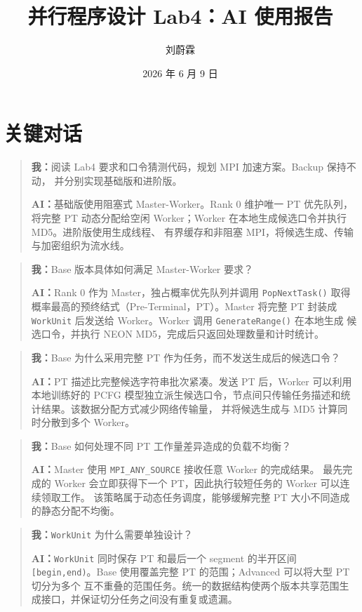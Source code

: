 \documentclass[12pt,a4paper]{ctexart}
\title{并行程序设计 Lab4：AI 使用报告}
\author{刘蔚霖\quad 2412727}
\date{2026 年 6 月 9 日}
\newcommand{\code}[1]{\nolinkurl{#1}}
\newenvironment{dialogue}
  {\begin{quote}\small\setlength{\parskip}{0.45em}}
  {\end{quote}}
\begin{document}
\maketitle

\section{关键对话}

\begin{dialogue}
\textbf{我：}阅读 Lab4 要求和口令猜测代码，规划 MPI 加速方案。Backup 保持不动，
并分别实现基础版和进阶版。

\textbf{AI：}基础版使用阻塞式 Master-Worker。Rank 0 维护唯一 PT 优先队列，将完整 PT
动态分配给空闲 Worker；Worker 在本地生成候选口令并执行 MD5。进阶版使用生成线程、
有界缓存和非阻塞 MPI，将候选生成、传输与加密组织为流水线。

\end{dialogue}

\begin{dialogue}
\textbf{我：}Base 版本具体如何满足 Master-Worker 要求？

\textbf{AI：}Rank 0 作为 Master，独占概率优先队列并调用 \code{PopNextTask()}
取得概率最高的预终结式（Pre-Terminal，PT）。Master 将完整 PT 封装成
\code{WorkUnit} 后发送给 Worker。Worker 调用 \code{GenerateRange()} 在本地生成
候选口令，并执行 NEON MD5，完成后只返回处理数量和计时统计。
\end{dialogue}

\begin{dialogue}
\textbf{我：}Base 为什么采用完整 PT 作为任务，而不发送生成后的候选口令？

\textbf{AI：}PT 描述比完整候选字符串批次紧凑。发送 PT 后，Worker 可以利用本地训练好的
PCFG 模型独立派生候选口令，节点间只传输任务描述和统计结果。该数据分配方式减少网络传输量，
并将候选生成与 MD5 计算同时分散到多个 Worker。
\end{dialogue}

\begin{dialogue}
\textbf{我：}Base 如何处理不同 PT 工作量差异造成的负载不均衡？

\textbf{AI：}Master 使用 \code{MPI\_ANY\_SOURCE} 接收任意 Worker 的完成结果。
最先完成的 Worker 会立即获得下一个 PT，因此执行较短任务的 Worker 可以连续领取工作。
该策略属于动态任务调度，能够缓解完整 PT 大小不同造成的静态分配不均衡。
\end{dialogue}

\begin{dialogue}
\textbf{我：}\code{WorkUnit} 为什么需要单独设计？

\textbf{AI：}\code{WorkUnit} 同时保存 PT 和最后一个 segment 的半开区间
\code{[begin,end)}。Base 使用覆盖完整 PT 的范围；Advanced 可以将大型 PT 切分为多个
互不重叠的范围任务。统一的数据结构使两个版本共享范围生成接口，并保证切分任务之间没有重复或遗漏。
\end{dialogue}
\end{document}

